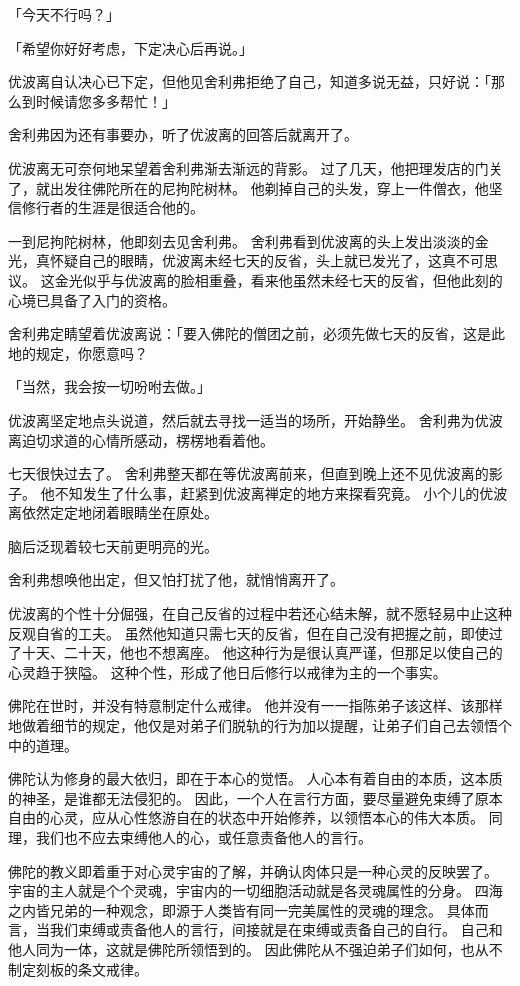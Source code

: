 \documentclass[twoside,openany]{book}
\begin{document}
「今天不行吗？」

「希望你好好考虑，下定决心后再说。」

优波离自认决心已下定，但他见舍利弗拒绝了自己，知道多说无益，只好说：「那么到时候请您多多帮忙！」

舍利弗因为还有事要办，听了优波离的回答后就离开了。

优波离无可奈何地呆望着舍利弗渐去渐远的背影。
过了几天，他把理发店的门关了，就出发往佛陀所在的尼拘陀树林。
他剃掉自己的头发，穿上一件僧衣，他坚信修行者的生涯是很适合他的。

一到尼拘陀树林，他即刻去见舍利弗。
舍利弗看到优波离的头上发出淡淡的金光，真怀疑自己的眼睛，优波离未经七天的反省，头上就已发光了，这真不可思议。
这金光似乎与优波离的脸相重叠，看来他虽然未经七天的反省，但他此刻的心境已具备了入门的资格。

舍利弗定睛望着优波离说：「要入佛陀的僧团之前，必须先做七天的反省，这是此地的规定，你愿意吗？

「当然，我会按一切吩咐去做。」

优波离坚定地点头说道，然后就去寻找一适当的场所，开始静坐。
舍利弗为优波离迫切求道的心情所感动，楞楞地看着他。

七天很快过去了。
舍利弗整天都在等优波离前来，但直到晚上还不见优波离的影子。
他不知发生了什么事，赶紧到优波离禅定的地方来探看究竟。
小个儿的优波离依然定定地闭着眼睛坐在原处。

脑后泛现着较七天前更明亮的光。

舍利弗想唤他出定，但又怕打扰了他，就悄悄离开了。

优波离的个性十分倔强，在自己反省的过程中若还心结未解，就不愿轻易中止这种反观自省的工夫。
虽然他知道只需七天的反省，但在自己没有把握之前，即使过了十天、二十天，他也不想离座。
他这种行为是很认真严谨，但那足以使自己的心灵趋于狭隘。
这种个性，形成了他日后修行以戒律为主的一个事实。

佛陀在世时，并没有特意制定什么戒律。
他并没有一一指陈弟子该这样、该那样地做着细节的规定，他仅是对弟子们脱轨的行为加以提醒，让弟子们自己去领悟个中的道理。

佛陀认为修身的最大依归，即在于本心的觉悟。
人心本有着自由的本质，这本质的神圣，是谁都无法侵犯的。
因此，一个人在言行方面，要尽量避免束缚了原本自由的心灵，应从心性悠游自在的状态中开始修养，以领悟本心的伟大本质。
同理，我们也不应去束缚他人的心，或任意责备他人的言行。

佛陀的教义即着重于对心灵宇宙的了解，并确认肉体只是一种心灵的反映罢了。
宇宙的主人就是个个灵魂，宇宙内的一切细胞活动就是各灵魂属性的分身。
四海之内皆兄弟的一种观念，即源于人类皆有同一完美属性的灵魂的理念。
具体而言，当我们束缚或责备他人的言行，间接就是在束缚或责备自己的自行。
自己和他人同为一体，这就是佛陀所领悟到的。
因此佛陀从不强迫弟子们如何，也从不制定刻板的条文戒律。
\end{document}
